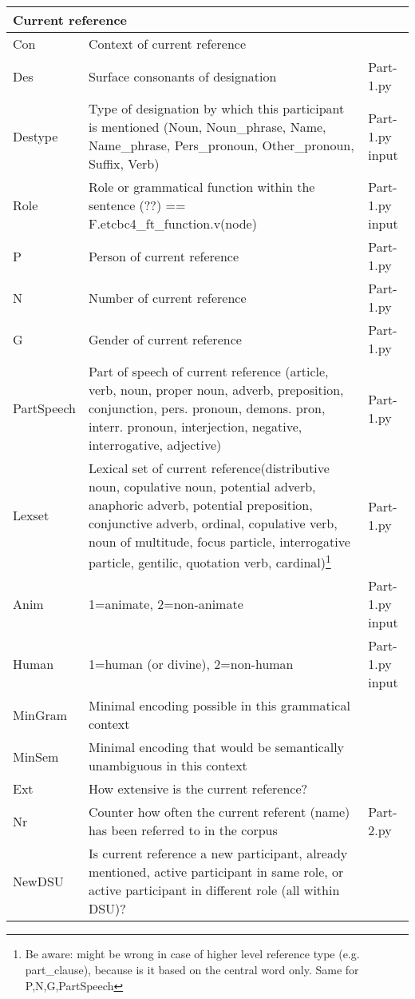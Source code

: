 \documentclass{article}
\begin{document}
\begin{longtable}{|l|p{}|l|}
\multicolumn{3}{|l|}{\bf{Current reference}} \\ \hline

Con & Context of current reference & \\ \hline
Des & Surface consonants of designation & Part-1.py \\ \hline
Destype & Type of designation by which this participant is mentioned (Noun, Noun\_phrase, Name, Name\_phrase, Pers\_pronoun, Other\_pronoun,  Suffix, Verb) & Part-1.py input \\ \hline
Role & Role or grammatical function within the sentence (??) == F.etcbc4\_ft\_function.v(node) & Part-1.py input\\ \hline
P & Person of current reference & Part-1.py \\ \hline
N & Number of current reference & Part-1.py \\ \hline
G & Gender of current reference & Part-1.py \\ \hline
PartSpeech & Part of speech of current reference (article, verb, noun, proper noun, adverb, preposition, conjunction, pers. pronoun, demons. pron, interr. pronoun, interjection, negative, interrogative, adjective) & Part-1.py \\ \hline
Lexset & Lexical set of current reference(distributive noun, copulative noun, potential adverb, anaphoric adverb, potential preposition, conjunctive adverb, ordinal, copulative verb, noun of multitude, focus particle, interrogative particle, gentilic, quotation verb, cardinal)\footnote{Be aware: might be wrong in case of higher level reference type (e.g. part\_clause), because is it based on the central word only. Same for P,N,G,PartSpeech} & Part-1.py \\ \hline
Anim & 1=animate, 2=non-animate & Part-1.py input \\ \hline
Human & 1=human (or divine), 2=non-human & Part-1.py input \\ \hline
MinGram & Minimal encoding possible in this grammatical context & \\ \hline
MinSem & Minimal encoding that would be semantically unambiguous in this context & \\ \hline
Ext & How extensive is the current reference? & \\ \hline
Nr & Counter how often the current referent (name) has been referred to in the corpus & Part-2.py \\ \hline
NewDSU & Is current reference a new participant, already mentioned, active participant in same role, or active participant in different role (all within DSU)?  & \\ \hline

\end{longtable}
\end{document}
